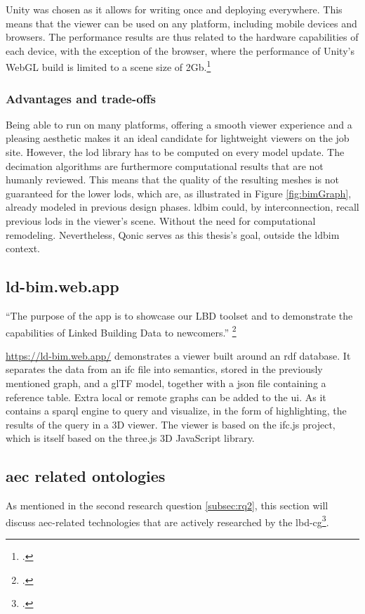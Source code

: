 Unity was chosen as it allows for writing once and deploying everywhere. This means that the viewer can be used on any platform, including mobile devices and browsers. The performance results are thus related to the hardware capabilities of each device, with the exception of the browser, where the performance of Unity's WebGL build is limited to a scene size of 2Gb.\footcite{UnityWebGL}

\subsubsection{Advantages and trade-offs}
Being able to run on many platforms, offering a smooth viewer experience and a pleasing aesthetic makes it an ideal candidate for lightweight viewers on the job site. However, the \ac{lod} library has to be computed on every model update. The decimation algorithms are furthermore computational results that are not humanly reviewed. This means that the quality of the resulting meshes is not guaranteed for the lower \ac{lod}s, which are, as illustrated in Figure \ref{fig:bimGraph}, already modeled in previous design phases. \ac{ldbim} could, by interconnection, recall previous \ac{lod}s in the viewer's scene. Without the need for computational remodeling. Nevertheless, Qonic serves as this thesis's goal, outside the \ac{ldbim} context.

\subsection{ld-bim.web.app}
\enquote{The purpose of the app is to showcase our LBD toolset and to demonstrate the capabilities of Linked Building Data to newcomers.} \footcite{lbdimApp}

\url{https://ld-bim.web.app/} demonstrates a viewer built around an \ac{rdf} database. It separates the data from an \ac{ifc} file into semantics, stored in the previously mentioned graph, and a glTF model, together with a \ac{json} file containing a reference table. Extra local or remote graphs can be added to the \ac{ui}. As it contains a \ac{sparql} engine to query and visualize, in the form of highlighting, the results of the query in a 3D viewer. The viewer is based on the ifc.js project, which is itself based on the three.js 3D JavaScript library.

\subsection{\acs{aec} related ontologies}
As mentioned in the second research question \ref{subsec:rq2}, this section will discuss \ac{aec}-related technologies that are actively researched by the \ac{lbd-cg}\footcite{lbdOntologies}.

